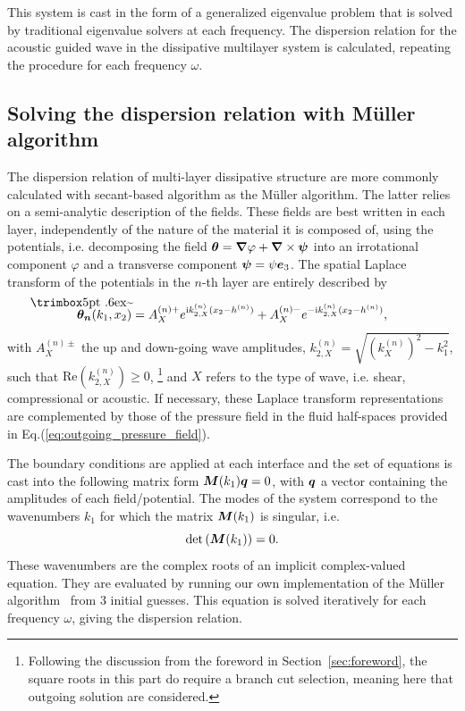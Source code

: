 This system is cast in the form of a generalized eigenvalue problem that is solved by traditional eigenvalue solvers at each frequency. The dispersion relation for the acoustic guided wave in the dissipative multilayer system is calculated, repeating the procedure for each frequency $\omega$.
    
\subsection{Solving the dispersion relation with M\"uller algorithm}
    \label{subsec:semi_a}

The dispersion relation of multi-layer dissipative structure are more commonly calculated with secant-based algorithm as the M\"uller algorithm. The latter relies on a semi-analytic description of the fields. These fields are best written in each layer, independently of the nature of the material it is composed of, using the potentials, i.e. decomposing the field $\boldsymbol \theta = \boldsymbol \nabla \varphi + \boldsymbol \nabla \times \boldsymbol \psi$ into an irrotational component $\varphi$ and a transverse component $\boldsymbol \psi=\psi \boldsymbol e_3$. The spatial Laplace transform of the potentials in the $n$-th layer are entirely described by
\begin{equation}
    \mbf{\tilde{\theta}_n}( k_1, x_2) =  A^{(n)+}_{X} e^{\im  k_{2,X}^{(n)}(x_2 - h^{(n)})} + A^{(n)-}_{X} e^{-\im  k_{2,X}^{(n)} (x_2 - h^{(n)})},
\end{equation}
with $ A^{(n)\pm}_{X}$ the up and down-going wave amplitudes, $k_{2,X}^{(n)}=\sqrt{\left(k_{X}^{(n)}\right)^2-k_1^2}$, such that $\textrm{Re}\left( k_{2,X}^{(n)}\right)\geq 0$, \footnote{Following the discussion from the foreword in Section~\ref{sec:foreword}, the square roots in this part do require a branch cut selection, meaning here that outgoing solution are considered.} and $X$ refers to the type of wave, i.e. shear, compressional or acoustic. If necessary, these Laplace transform representations are complemented by those of the pressure field in the fluid half-spaces provided in Eq.(\ref{eq:outgoing_pressure_field}).

The boundary conditions are applied at each interface and the set of equations is cast into the following matrix form $\boldsymbol M( k_1) \boldsymbol q = 0$, with $ \boldsymbol q$ a vector containing the amplitudes of each field/potential. The modes of the system correspond to the wavenumbers $ k_1$ for which the matrix $\boldsymbol M( k_1)$ is singular, i.e.
    \begin{equation}
        \text{det}\left( \boldsymbol M( k_1)\right) = 0.
        \label{eq:det_M}
    \end{equation}
These wavenumbers are the complex roots of an implicit complex-valued equation. They are evaluated by running our own implementation of the Müller algorithm~\cite{muller1956} from 3 initial guesses. This equation is solved iteratively for each frequency $\omega$, giving the dispersion relation.\\
    
